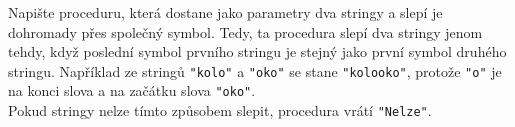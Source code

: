 \question[50]
Napište proceduru, která dostane jako parametry dva stringy a slepí je
dohromady
přes společný symbol. Tedy, ta procedura slepí dva stringy jenom
tehdy, když
poslední symbol prvního stringu je stejný jako první symbol
druhého
stringu. Například ze stringů \texttt{"kolo"} a
\texttt{"oko"} se
stane
\texttt{"kolooko"}, protože \texttt{"o"} je na konci slova a na začátku
slova \texttt{"oko"}.\\
Pokud stringy nelze
tímto způsobem slepit, procedura
vrátí \texttt{"Nelze"}.